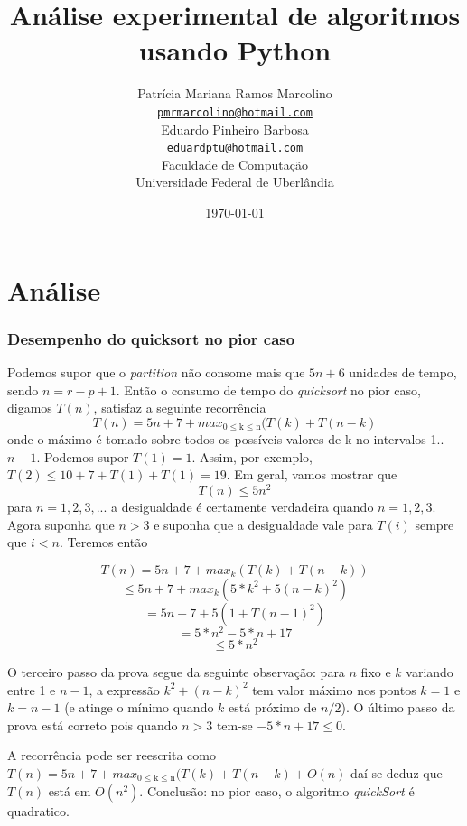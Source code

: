 \documentclass[12pt,a4paper,twoside]{report}
\title{Análise experimental de algoritmos usando Python}
\author{Patrícia Mariana Ramos Marcolino \\
\texttt{\small \url{pmrmarcolino@hotmail.com}}
\vspace{1cm} \\
Eduardo Pinheiro Barbosa\\
\texttt{\small \url{eduardptu@hotmail.com}}
\vspace{1cm} \\
Faculdade de Computação \\
Universidade Federal de Uberlândia
}
\date{\today}
\begin{document}
\maketitle
\listoffigures
\listoftables
\lstlistoflistings

\tableofcontents
\fancyhead[RE,LO]{\thesection}

\setlength{\parskip}{0.15in} %

\chapter{Análise}
\subsection{Desempenho do quicksort no pior caso}
Podemos supor que o {\it partition} não consome mais que $5n+6$ unidades de tempo, sendo $n=r-p+1$. Então o consumo de tempo do {\it quicksort} no pior caso, digamos $T(n)$, satisfaz a seguinte recorrência \[T(n) = 5n+7+ max _{\text{0} \leq \text{k} \leq \text{n}} (T(k)+T(n-k)\]
onde o máximo é tomado sobre todos os possíveis valores de k no intervalos 1.. $n-1$. Podemos supor $T(1)=1$. Assim, por exemplo, $T(2)\leq 10+7+T(1)+T(1)= 19$. Em geral, vamos mostrar que \[T(n) \leq 5n^2\]
para $n = 1,2,3,...$ a desigualdade é certamente verdadeira quando $n=1,2,3$. Agora suponha que $n>3$ e suponha que a desigualdade vale para $T(i)$ sempre que $i<n$. Teremos então

\[T(n) = 5n+7+max_{k} (T(k) + T(n-k))\]
\[\leq 5n+7+max_{k} (5*k^2+5(n-k)^2)\]
\[= 5n+7+5(1 + T(n-1)^2)\]
\[= 5*n^2 - 5*n+17\]
\[\leq 5*n^2\]

O terceiro passo da prova segue da seguinte observação: para $n$ fixo e $k$ variando entre 1 e $n-1$, a expressão $k^2+(n-k)^2$ tem valor máximo nos pontos $k = 1$ e $k=n-1$ (e atinge o mínimo quando $k$ está próximo de $n/2$). O último passo da prova está correto pois quando $n>3$ tem-se $-5*n+17 \leq0$.

A recorrência pode ser reescrita como $T(n) = 5n+7+ max _{\text{0} \leq \text{k} \leq \text{n}} (T(k)+T(n-k) + O(n)$ daí se deduz que $T(n)$ está em $O(n^2)$. Conclusão: no pior caso, o algoritmo {\it quickSort} é quadratico.  
\end{document}

